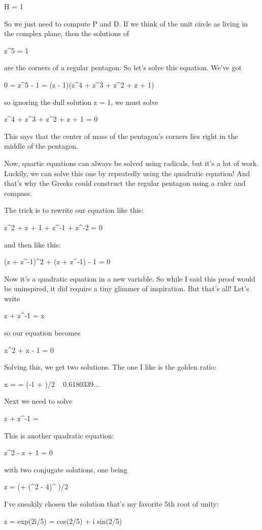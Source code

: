 H = 1

So we just need to compute P and D.  If we think of the unit circle as 
living in the complex plane, then the solutions of 

z^{5} = 1

are the corners of a regular pentagon.  So let's solve this equation.
We've got

0 = z^{5} - 1 = (z - 1)(z^{4} + z^{3} +
z^{2} + z + 1)

so ignoring the dull solution z = 1, we must solve

z^{4} + z^{3} + z^{2} + z + 1 = 0

This says that the center of mass of the pentagon's corners lies right
in the middle of the pentagon.

Now, quartic equations can always be solved using radicals, but it's 
a lot of work.  Luckily, we can solve this one by repeatedly using 
the quadratic equation!  And that's why the Greeks could construct 
the regular pentagon using a ruler and compass.  

The trick is to rewrite our equation like this:

z^{2} + z + 1 + z^{-1} + z^{-2} = 0

and then like this:

(z + z^{-1})^{2} + (z + z^{-1}) - 1 = 0

Now it's a quadratic equation in a new variable.  So while I said this 
proof would be uninspired, it did require a tiny glimmer of inspiration.
But that's all!  Let's write

z + z^{-1} = x

so our equation becomes

x^{2} + x - 1 = 0

Solving this, we get two solutions.  The one I like is the golden
ratio:

x = \phi  = (-1 + )/2 ~ 0.6180339...

Next we need to solve

z + z^{-1} = \phi 

This is another quadratic equation:

z^{2} - \phi  z + 1 = 0

with two conjugate solutions, one being

z = (\phi  + (\phi ^{2} - 4)^{ })/2

I've sneakily chosen the solution that's my favorite 5th root of unity:

z = exp(2\pi i/5) = cos(2\pi /5) + i sin(2\pi /5)

